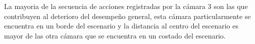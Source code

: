 La mayoria de la secuencia de acciones registradas por la cámara 3 son las que contribuyen al deterioro del desempeño general, esta cámara particularmente se encuentra en un borde del escenario y la distancia al centro del escenario es mayor de las otra cámara que se encuentra en un costado del escenario. 




